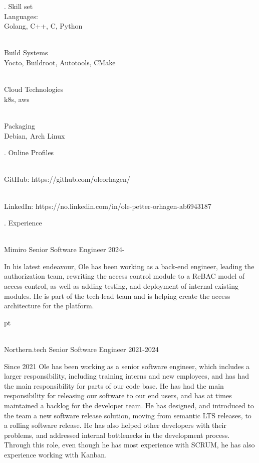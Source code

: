 \finishpage

. {Skill set}
\\ Languages:
\\ \star Golang, C++, C, Python

\\ Build Systems
\\ \star Yocto, Buildroot, Autotools, CMake

\\ Cloud Technologies
\\ \star k8s, aws

\\ Packaging
\\ \star Debian, Arch Linux

. {Online Profiles}

\\ \star GitHub: https://github.com/oleorhagen/

\\ \star LinkedIn: https://no.linkedin.com/in/ole-petter-orhagen-ab6943187

. {Experience}


\\ \star Mimiro Senior Software Engineer 2024-

In his latest endeavour, Ole has been working as a back-end engineer, leading the
authorization team, rewriting the access control module to a ReBAC model of
access control, as well as adding testing, and deployment of internal existing
modules. He is part of the tech-lead team and is helping create the access
architecture for the platform.

 pt

\\ \star Northern.tech Senior Software Engineer 2021-2024

Since 2021 Ole has been working as a senior software engineer, which includes a
larger responsibility, including training interns and new employees, and has had
the main responsibility for parts of our code base. He has had the main
responsibility for releasing our software to our end users, and has at times
maintained a backlog for the developer team. He has designed, and introduced to
the team a new software release solution, moving from semantic LTS releases, to
a rolling software release. He has also helped other developers with their
problems, and addressed internal bottlenecks in the development process. Through
this role, even though he has most experience with SCRUM, he has also experience
working with Kanban.

